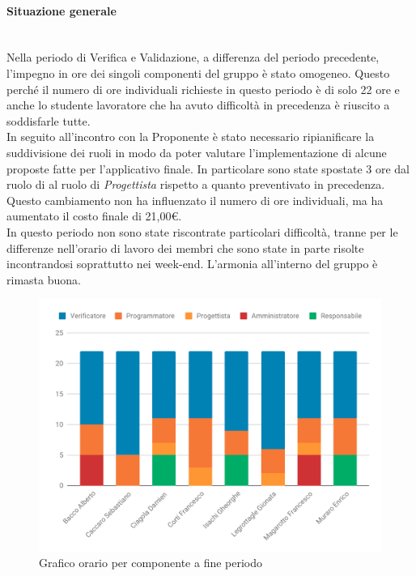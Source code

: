 \paragraph{Situazione generale} \mbox{}\\
Nella periodo di Verifica e Validazione, a differenza del periodo precedente, l'impegno in ore dei singoli componenti del gruppo è stato omogeneo. Questo perché il numero di ore individuali richieste in questo periodo è di solo 22 ore e anche lo studente lavoratore che ha avuto difficoltà in precedenza è riuscito a soddisfarle tutte.\\
In seguito all'incontro con la Proponente è stato necessario ripianificare la suddivisione dei ruoli in modo da poter valutare l'implementazione di alcune proposte fatte per l'applicativo finale. In particolare sono state spostate 3 ore dal ruolo di \progr{} al ruolo di \textit{Progettista} rispetto a quanto preventivato in precedenza. Questo cambiamento non ha influenzato il numero di ore individuali, ma ha aumentato il costo finale di 21,00\euro. \\
In questo periodo non sono state riscontrate particolari difficoltà, tranne per le differenze nell'orario di lavoro dei membri che sono state in parte risolte incontrandosi soprattutto nei week-end. L'armonia all'interno del gruppo è rimasta buona.\\

\begin{figure}[H]
	\centering
	\includegraphics[scale=.8]{Consuntivo/grafici/ConsVer.pdf} 
	\caption{Grafico orario per componente a fine periodo}
\end{figure}